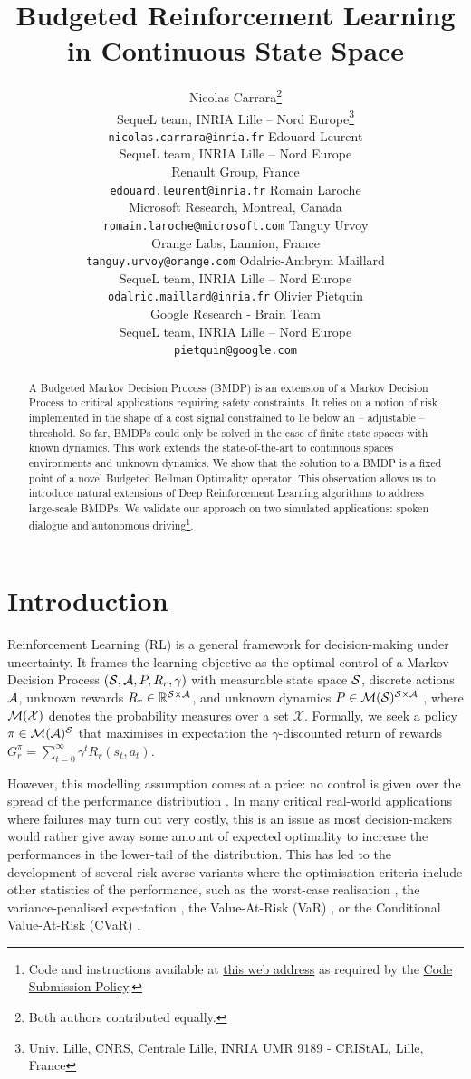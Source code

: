\documentclass{article}
\title{Budgeted Reinforcement Learning in Continuous State Space}
\author{
Nicolas Carrara\thanks{Both authors contributed equally.}\\
SequeL team, INRIA Lille -- Nord Europe\thanks{Univ. Lille, CNRS, Centrale Lille, INRIA UMR 9189 - CRIStAL, Lille, France}\\
\texttt{nicolas.carrara@inria.fr}
\And
Edouard Leurent\footnotemark[1]\\
SequeL team, INRIA Lille -- Nord Europe\footnotemark[2]\\
Renault Group, France\\
\texttt{edouard.leurent@inria.fr}
\And
Romain Laroche\\
Microsoft Research, Montreal, Canada\\
\texttt{romain.laroche@microsoft.com}
\And
Tanguy Urvoy\\
Orange Labs, Lannion, France\\
\texttt{tanguy.urvoy@orange.com}
\And
Odalric-Ambrym Maillard\\
SequeL team, INRIA Lille -- Nord Europe\\
\texttt{odalric.maillard@inria.fr}
\And
Olivier Pietquin\\
Google Research - Brain Team\\
SequeL team, INRIA Lille -- Nord Europe\footnotemark[2]\\
\texttt{pietquin@google.com}
}
\begin{document}
\maketitle
\begin{abstract}
    A Budgeted Markov Decision Process (BMDP) is an extension of a Markov Decision Process to critical applications requiring safety constraints. It relies on a notion of risk implemented in the shape of a cost signal constrained  to lie below an -- adjustable -- threshold.
    So far, BMDPs could only be solved in the case of finite state spaces with known dynamics. This work extends the state-of-the-art to continuous spaces environments and unknown dynamics. We show that the solution to a BMDP is a fixed point of a novel Budgeted Bellman Optimality operator. This observation allows us to introduce natural extensions of Deep Reinforcement Learning algorithms to address large-scale BMDPs. We validate our approach on two simulated applications: spoken dialogue and autonomous driving\footnote{Code and instructions available at \href{https://github.com/budgeted-rl/budgeted-rl.github.io\#how-to-reproduce}{this web address} as required by the \href{https://docs.google.com/document/d/1SBCfisdLU2A_vb7K7wI8oRBin8ZA4cA1BbasqfQr5m0/edit}{Code Submission Policy}.}.
\end{abstract}

\section{Introduction}
\label{sec:intro}

Reinforcement Learning (RL) is a general framework for decision-making under uncertainty. It frames the learning objective as the optimal control of a Markov Decision Process  $(\mathcal{S}, \mathcal{A}, P, R_r, \gamma)$ with measurable state space $\mathcal{S}$, discrete actions $\mathcal{A}$, unknown rewards $R_r\in\mathbb{R}^{\mathcal{S} \times \mathcal{A}}$, and unknown dynamics $P\in \mathcal{M}(\mathcal{S})^{\mathcal{S} \times \mathcal{A}}$ , where $\mathcal{M}(\mathcal{X})$ denotes the probability measures over a set $\mathcal{X}$. Formally, we seek a policy $\pi\in\mathcal{M}(\mathcal{A})^{\mathcal{S}}$ that maximises in expectation the $\gamma$-discounted return of rewards $G_r^\pi = \sum_{t=0}^\infty \gamma^t R_r(s_t, a_t)$.

However, this modelling assumption comes at a price: no control is given over the spread of the performance distribution \citep{Dann2018}. In many critical real-world applications where failures may turn out very costly, this is an issue as most decision-makers would rather give away some amount of expected optimality to increase the performances in the lower-tail of the distribution. This has led to the development of several risk-averse variants where the optimisation criteria include other statistics of the performance, such as the worst-case realisation \citep{Iyengar2005,Nilim2005,Wiesemann2013}, the variance-penalised expectation \citep{Garcia2015,Tamar2012}, the Value-At-Risk (VaR) \citep{Mausser2003,Luenberger2013}, or the Conditional Value-At-Risk (CVaR) \citep{Chow2014,ChowGJP15}.
\end{document}
